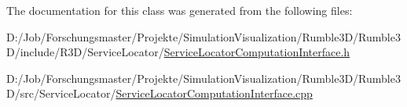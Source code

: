 The documentation for this class was generated from the following files\+:\begin{DoxyCompactItemize}
\item 
D\+:/\+Job/\+Forschungsmaster/\+Projekte/\+Simulation\+Visualization/\+Rumble3\+D/\+Rumble3\+D/include/\+R3\+D/\+Service\+Locator/\mbox{\hyperlink{_service_locator_computation_interface_8h}{Service\+Locator\+Computation\+Interface.\+h}}\item 
D\+:/\+Job/\+Forschungsmaster/\+Projekte/\+Simulation\+Visualization/\+Rumble3\+D/\+Rumble3\+D/src/\+Service\+Locator/\mbox{\hyperlink{_service_locator_computation_interface_8cpp}{Service\+Locator\+Computation\+Interface.\+cpp}}\end{DoxyCompactItemize}
